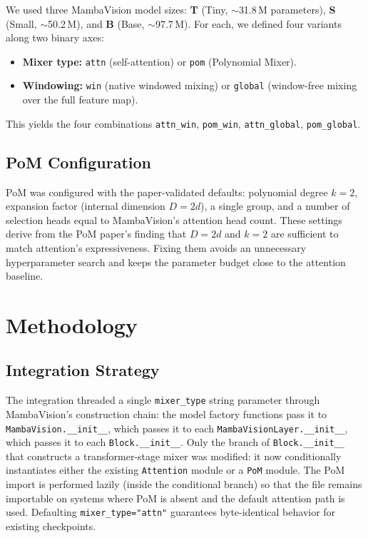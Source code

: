 \documentclass[11pt,a4paper]{article}
\begin{document}
We used three MambaVision model sizes: \textbf{T} (Tiny, $\sim$31.8\,M parameters), \textbf{S} (Small, $\sim$50.2\,M), and \textbf{B} (Base, $\sim$97.7\,M). For each, we defined four variants along two binary axes:
\begin{itemize}[leftmargin=1.5em, nosep]
    \item \textbf{Mixer type:} \texttt{attn} (self-attention) or \texttt{pom} (Polynomial Mixer).
    \item \textbf{Windowing:} \texttt{win} (native windowed mixing) or \texttt{global} (window-free mixing over the full feature map).
\end{itemize}
This yields the four combinations \texttt{attn\_win}, \texttt{pom\_win}, \texttt{attn\_global}, \texttt{pom\_global}.

\subsection{PoM Configuration}

PoM was configured with the paper-validated defaults: polynomial degree $k=2$, expansion factor (internal dimension $D = 2d$), a single group, and a number of selection heads equal to MambaVision's attention head count. These settings derive from the PoM paper's finding that $D=2d$ and $k=2$ are sufficient to match attention's expressiveness. Fixing them avoids an unnecessary hyperparameter search and keeps the parameter budget close to the attention baseline.

\section{Methodology}

\subsection{Integration Strategy}

The integration threaded a single \texttt{mixer\_type} string parameter through MambaVision's construction chain: the model factory functions pass it to \texttt{MambaVision.\_\_init\_\_}, which passes it to each \texttt{MambaVisionLayer.\_\_init\_\_}, which passes it to each \texttt{Block.\_\_init\_\_}. Only the branch of \texttt{Block.\_\_init\_\_} that constructs a transformer-stage mixer was modified: it now conditionally instantiates either the existing \texttt{Attention} module or a \texttt{PoM} module. The PoM import is performed lazily (inside the conditional branch) so that the file remains importable on systems where PoM is absent and the default attention path is used. Defaulting \texttt{mixer\_type="attn"} guarantees byte-identical behavior for existing checkpoints.
\end{document}
